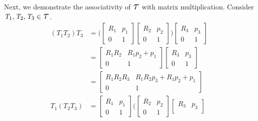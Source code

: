 \documentclass[11pt]{article}
\newcommand\Tau{\scalerel*{\tau}{T}}
\begin{document}
\begin{enumerate}[leftmargin=0.3in]
\begin{enumerate}
       Next, we demonstrate the associativity of $\Tau$ with matrix multiplication. Consider $\mathit{T}_1, \mathit{T}_2, \mathit{T}_3 \in \Tau$.
       \begin{align*}
           ( \mathit{T}_1 \mathit{T}_2 ) \mathit{T}_3 &= \bigg( \begin{bmatrix}
              \mathit{R}_1 & \mathit{p}_1 \\
              0 & 1
              \end{bmatrix} \begin{bmatrix}
              \mathit{R}_2 & \mathit{p}_2 \\
              0 & 1
          \end{bmatrix} \bigg) \begin{bmatrix}
              \mathit{R}_3 & \mathit{p}_3 \\
              0 & 1
            \end{bmatrix} \\
              &= \begin{bmatrix}
                  \mathit{R}_1 \mathit{R}_2 & \mathit{R}_1 \mathit{p}_2 + \mathit{p}_1 \\
                  0 & 1
                  \end{bmatrix} \begin{bmatrix}
              \mathit{R}_3 & \mathit{p}_3 \\
              0 & 1
            \end{bmatrix} \\
              &= \begin{bmatrix}
                  \mathit{R}_1 \mathit{R}_2 \mathit{R}_3 & \mathit{R}_1 \mathit{R}_2 \mathit{p}_3 + \mathit{R}_1 \mathit{p}_2 + \mathit{p}_1 \\
                  0 & 1
              \end{bmatrix} \\
           \mathit{T}_1 ( \mathit{T}_2 \mathit{T}_3 ) &= \begin{bmatrix}
              \mathit{R}_1 & \mathit{p}_1 \\
              0 & 1
              \end{bmatrix} \bigg( \begin{bmatrix}
              \mathit{R}_2 & \mathit{p}_2 \\
              0 & 1
          \end{bmatrix} \begin{bmatrix}
              \mathit{R}_3 & \mathit{p}_3 \\

\end{bmatrix}
\end{align*}
\end{enumerate}
\end{enumerate}
\end{document}
